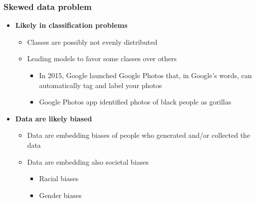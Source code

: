 \documentclass{beamer}
\begin{document}
\begin{frame}\frametitle{Skewed data problem}
\begin{itemize}
	\setlength\itemsep{1em}
	\item {\bf Likely in classification problems}
	\begin{itemize}
		\item Classes are possibly not evenly distributed
		\item Leading models to favor some classes over others
		\begin{itemize}
			\item In 2015, Google launched Google Photos that, in Google's words, can automatically tag and label your photos
			\item Google Photos app identified photos of black people as gorillas
		\end{itemize}
	\end{itemize}
	\item {\bf Data are likely biased}
	\begin{itemize}
		\item Data are embedding biases of people who generated and/or collected the data
		\item Data are embedding also societal biases
		\begin{itemize}
			\item Racial biases
			\item Gender biases
		\end{itemize}
	\end{itemize}
\end{itemize}
\end{frame}
\end{document}
